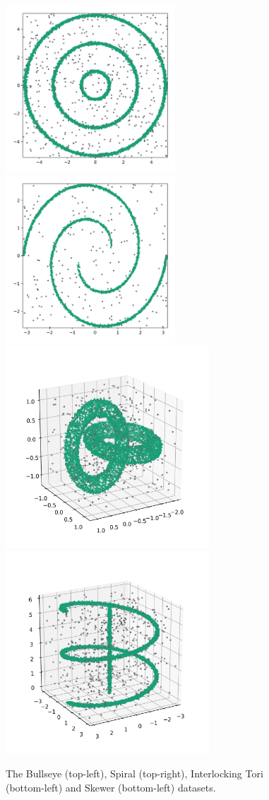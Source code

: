 \begin{figure}[!t]
\centering
\includegraphics[width=2.5in]{static/bullseye.png}
\includegraphics[width=2.5in]{static/spiral.png}
\includegraphics[width=3in]{static/interlocking_tori.png}
\includegraphics[width=3in]{static/skewer.png}
\caption{The Bullseye (top-left), Spiral (top-right), Interlocking Tori (bottom-left) and Skewer (bottom-left) datasets.}
\label{results:datasets}
\end{figure}

